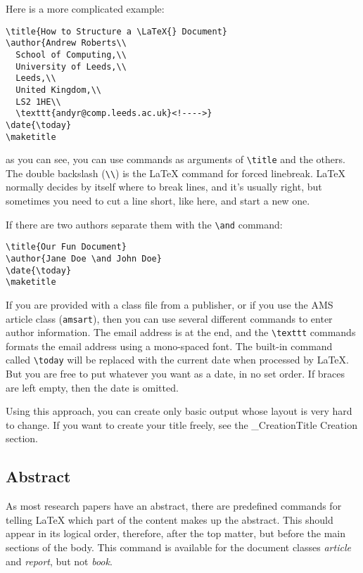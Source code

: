 Here is a more complicated example:
\begin{verbatim}
\title{How to Structure a \LaTeX{} Document}
\author{Andrew Roberts\\
  School of Computing,\\
  University of Leeds,\\
  Leeds,\\
  United Kingdom,\\
  LS2 1HE\\
  \texttt{andyr@comp.leeds.ac.uk}<!---->}
\date{\today}
\maketitle
\end{verbatim}

as you can see, you can use commands as arguments of \verb|\title|
and the others. The double backslash (\verb|\\|) is the
LaTeX command for forced linebreak. LaTeX normally decides by itself where to
break lines, and it's usually right, but sometimes you need to cut a line
short, like here, and start a new one.

If there are two authors separate them with the \verb|\and|
command:
\begin{verbatim}
\title{Our Fun Document}
\author{Jane Doe \and John Doe} 
\date{\today}
\maketitle
\end{verbatim}

If you are provided with a class file from a publisher, or if you use the AMS
article class (\texttt{amsart}), then you can use several different
commands to enter author information. The email address is at the end, and the
\verb|\texttt| commands formats the email address using a
mono-spaced font. The built-in command called \verb|\today| will
be replaced with the current date when processed by LaTeX. But you are free to
put whatever you want as a date, in no set order. If braces are left empty,
then the date is omitted. 

Using this approach, you can create only basic output whose layout is very hard
to change. If you want to create your title freely, see the \_CreationTitle
Creation section.

\subsection{ Abstract }
As most research papers have an abstract, there are predefined commands for
telling LaTeX which part of the content makes up the abstract. This should
appear in its logical order, therefore, after the top matter, but before the
main sections of the body. This command is available for the document classes
\textit{article} and \textit{report}, but not \textit{book}. 

